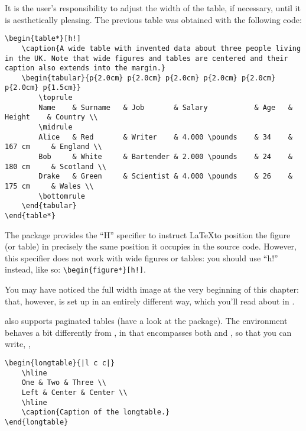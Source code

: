It is the user's responsibility to adjust the width of the table, if
necessary, until it is aesthetically pleasing. The previous table was
obtained with the following code:

\begin{lstlisting}[caption=How to typeset a wide table]
\begin{table*}[h!]
    \caption{A wide table with invented data about three people living in the UK. Note that wide figures and tables are centered and their caption also extends into the margin.}
    \begin{tabular}{p{2.0cm} p{2.0cm} p{2.0cm} p{2.0cm} p{2.0cm} p{2.0cm} p{1.5cm}}
        \toprule
        Name    & Surname   & Job       & Salary           & Age   & Height    & Country \\
        \midrule
        Alice   & Red       & Writer    & 4.000 \pounds    & 34    & 167 cm     & England \\
        Bob     & White     & Bartender & 2.000 \pounds    & 24    & 180 cm     & Scotland \\
        Drake   & Green     & Scientist & 4.000 \pounds    & 26    & 175 cm     & Wales \\
        \bottomrule
    \end{tabular}
\end{table*}
\end{lstlisting}

The  package provides the \enquote{H} specifier to
instruct \LaTeX to position the figure (or table) in precisely the same
position it occupies in the source code. However, this specifier does
not work with wide figures or tables: you should use \enquote{h!}
instead, like so: \lstinline|\begin{figure*}[h!]|.

You may have noticed the full width image at the very beginning of this
chapter: that, however, is set up in an entirely different way, which
you'll read about in .

 also supports paginated tables (have a look at the
 package). The
 environment behaves a bit differently from
, in that  encompasses both
 and , so that you can write,
\eg,

\begin{lstlisting}[caption=Example of a longtable]
\begin{longtable}{|l c c|}
    \hline
    One & Two & Three \\
    Left & Center & Center \\
    \hline
    \caption{Caption of the longtable.}
\end{longtable}
\end{lstlisting}

